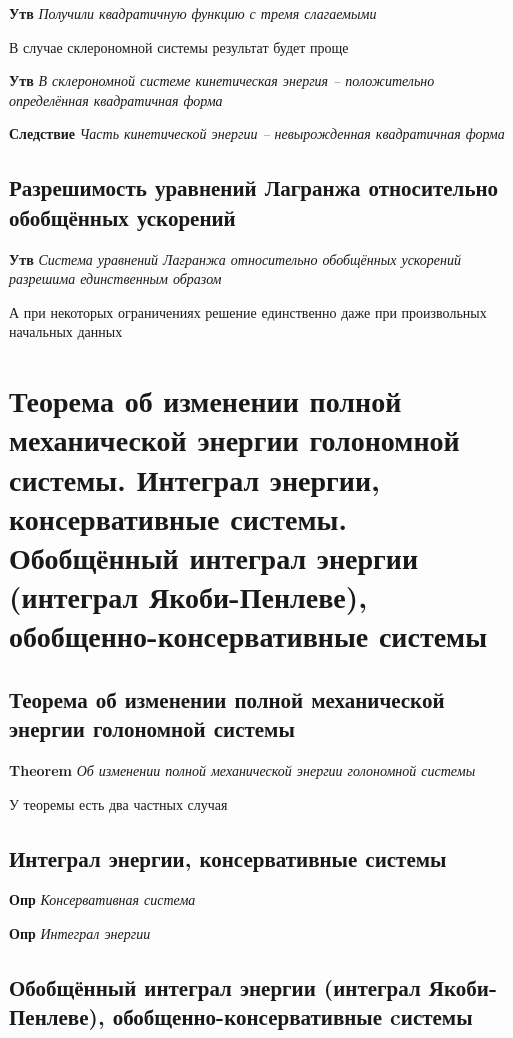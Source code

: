 \documentclass[a4paper, 14pt]{article}
\begin{document}
    \textbf{Утв} \textit{Получили квадратичную функцию с тремя слагаемыми}
    
    В случае склерономной системы результат будет проще
    
    \textbf{Утв} \textit{В склерономной системе кинетическая энергия -- положительно определённая квадратичная форма}
    
    \textbf{Следствие} \textit{Часть кинетической энергии -- невырожденная квадратичная форма}
    
    \subsection{Разрешимость уравнений Лагранжа относительно обобщённых ускорений}
    
    \textbf{Утв} \textit{Система уравнений Лагранжа относительно обобщённых ускорений разрешима единственным образом}
    
    А при некоторых ограничениях решение единственно даже при произвольных начальных данных
    
    \section{Теорема об изменении полной механической энергии голономной системы.
    Интеграл энергии, консервативные системы.
    Обобщённый интеграл энергии (интеграл Якоби-Пенлеве), обобщенно-консервативные системы}
    
    \subsection{Теорема об изменении полной механической энергии голономной системы}
    
    \textbf{Theorem} \textit{Об изменении полной механической энергии голономной системы}
    
    У теоремы есть два частных случая
    
    \subsection{Интеграл энергии, консервативные системы}
    
    \textbf{Опр} \textit{Консервативная система}
    
    \textbf{Опр} \textit{Интеграл энергии}
    
    \subsection{Обобщённый интеграл энергии (интеграл Якоби-Пенлеве), обобщенно-консервативные cистемы}
\end{document}
